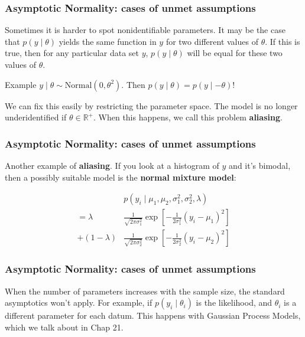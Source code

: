 \documentclass{beamer}
\begin{document}
\begin{frame}
\frametitle{Asymptotic Normality: cases of unmet assumptions}

Sometimes it is harder to spot nonidentifiable parameters. It may be the case that $p(y \mid \theta)$ yields the same function in $y$ for two different values of $\theta$. If this is true, then for any particular data set $y$, $p(y \mid \theta)$ will be equal for these two values of $\theta$.
\newline

Example $y \mid \theta \sim \text{Normal}(0, \theta^2)$. Then $p(y \mid \theta) = p(y \mid -\theta)$!
\newline

We can fix this easily by restricting the parameter space. The model is no longer underidentified if $\theta \in \mathbb{R}^+$. When this happens, we call this problem {\bf aliasing}.

\end{frame}

\begin{frame}
\frametitle{Asymptotic Normality: cases of unmet assumptions}

Another example of {\bf aliasing}. If you look at a histogram of $y$ and it's bimodal, then a possibly suitable model is the {\bf normal mixture model}:

\begin{align*}
&p(y_i \mid \mu_1, \mu_2, \sigma_1^2, \sigma_2^2, \lambda) \\
= \lambda &\frac{1}{\sqrt{2\pi \sigma_1^2}} \exp\left[-\frac{1}{2 \sigma_1^2}(y_i - \mu_1)^2 \right] \\
+ (1-\lambda) &\frac{1}{\sqrt{2\pi \sigma_2^2}}\exp\left[-\frac{1}{2 \sigma_2^2}(y_i - \mu_2)^2 \right]
\end{align*}
\end{frame}

\begin{frame}
\frametitle{Asymptotic Normality: cases of unmet assumptions}

When the number of parameters increases with the sample size, the standard asymptotics won't apply. For example, if $p(y_i \mid \theta_i)$ is the likelihood, and $\theta_i$ is a different parameter for each datum. This happens with Gaussian Process Models, which we talk about in Chap 21.

\end{frame}
\end{document}
